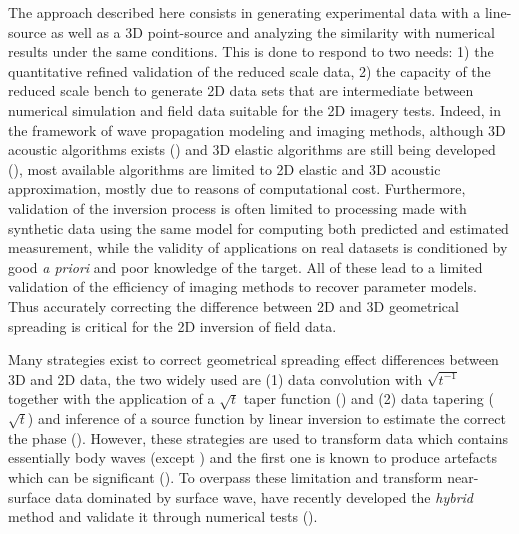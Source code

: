 \documentclass[extra,mreferee]{gji}
\begin{document}
The approach described here consists in generating experimental data with a line-source as well as a 3D point-source and analyzing the similarity with numerical results under the same conditions. This is done to respond to two needs: 1) the quantitative refined validation of the reduced scale data, 2) the capacity of the reduced scale bench to generate 2D data sets that are intermediate between numerical simulation and field data suitable for the 2D imagery tests. Indeed, in the framework of wave propagation modeling and imaging methods, although 3D acoustic algorithms exists (\cite{benhadjali_FWI_2008,plessix_FWI_2010}) and 3D elastic algorithms are still being developed (\cite{castellanos_AMD_2011,borisov2015three}), most available algorithms are limited to 2D elastic and 3D acoustic approximation, mostly due to reasons of computational cost. Furthermore,  validation of the inversion process is often limited to processing made with synthetic data using the same model for computing both predicted and estimated measurement, while the validity of applications on real datasets is conditioned by good \textit{a priori} and poor knowledge of the target. All of these lead to a limited validation of the efficiency of imaging methods to recover parameter models. Thus accurately correcting the difference between 2D and 3D geometrical spreading is critical for the 2D inversion of field data.

Many strategies exist to correct geometrical spreading effect differences between 3D and 2D data, the two widely used are (1) data convolution with $\sqrt{t^{-1}}$ together with the application of a $\sqrt{t}$ taper function (\cite{crase1990robust,shipp2002two,ravaut2004multiscale}) and (2) data tapering ($\sqrt{t}$) and inference of a source function by linear inversion to estimate the correct the phase (\cite{pratt1999fwi,bretaudeau2013fwi}). However, these strategies are used to transform data which contains essentially body waves (except \cite{bretaudeau2013fwi}) and the first one is known to produce artefacts which can be significant (\cite{auer2013critical}). To overpass these limitation and transform near-surface data dominated by surface wave, \cite{Forbriger_LSS_2014} have recently developed the \textit{hybrid} method and validate it through numerical tests (\cite{schafer2014lss}).
\end{document}
